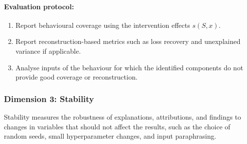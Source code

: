 \paragraph{Evaluation protocol:}
\begin{enumerate}
\item Report behavioural coverage using the intervention effects \(s(S,x)\).
\item Report reconstruction-based metrics such as loss recovery and unexplained variance if applicable.
\item Analyse inputs of the behaviour for which the identified components do not provide good coverage or reconstruction.
\end{enumerate}

\subsubsection*{Dimension 3: Stability}
Stability measures the robustness of explanations, attributions, and findings to changes in variables that should not affect the results, such as the choice of random seeds, small hyperparameter changes, and input paraphrasing.

